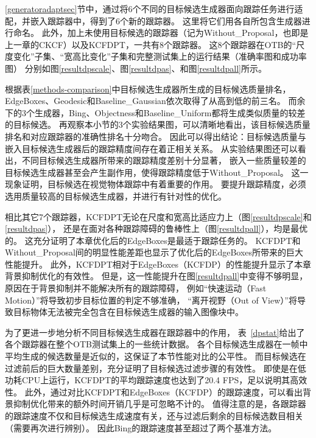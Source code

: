 \ref{generatoradaptsec}节中，通过将6个不同的目标候选生成器面向跟踪任务进行适配，并嵌入跟踪器中，得到了6个新的跟踪器。
这里将它们用各自所包含生成器进行命名。
此外，加上未使用目标候选的跟踪器（记为Without\_Proposal，也即是上一章的CKCF）以及KCFDPT，一共有8个跟踪器。
这8个跟踪器在OTB的``尺度变化''子集、``宽高比变化''子集和完整测试集上的运行结果（准确率图和成功率图）
分别如图\ref{resultdpscale}、图\ref{resultdpas}、和图\ref{resultdpall}所示。

根据表\ref{methods-comparison}中目标候选生成器所生成的目标候选质量排名，
EdgeBoxes、Geodesic和Baseline\_Gaussian依次取得了从高到低的前三名。
而余下的3个生成器，Bing、Objectness和Baseline\_Uniform都将生成类似质量的较差的目标候选。
再观察本小节的3个实验结果图，可以清晰地看出，该目标候选质量排名和对应跟踪器的准确性排名十分吻合。
因此可以得出结论：目标候选质量与嵌入目标候选生成器后的跟踪精度间存在着正相关关系。
从实验结果图还可以看出，不同目标候选生成器所带来的跟踪精度差别十分显著，
嵌入一些质量较差的目标候选生成器甚至会产生副作用，使得跟踪精度低于Without\_Proposal。
这一现象证明，目标候选在视觉物体跟踪中有着重要的作用。
要提升跟踪精度，必须选用质量较高的目标候选生成器，并进行有针对性的优化。

相比其它7个跟踪器，KCFDPT无论在尺度和宽高比适应力上（图\ref{resultdpscale}和\ref{resultdpas}），
还是在面对各种跟踪障碍的鲁棒性上（图\ref{resultdpall}），均是最优的。
这充分证明了本章优化后的EdgeBoxes是最适于跟踪任务的。
KCFDPT和Without\_Proposal间的明显性能差距也显示了优化后的EdgeBoxes所带来的巨大性能提升。
此外，KCFDPT相对于EdgeBoxes（KCFDP）的性能提升显示了本章背景抑制优化的有效性。
但是，这一性能提升在图\ref{resultdpall}中变得不够明显，原因在于背景抑制并不能解决所有的跟踪障碍，
例如``快速运动（Fast Motion）''将导致初步目标位置的判定不够准确，
``离开视野（Out of View）''将导致目标物体无法被完全包含在目标候选生成器的输入图像块中。

为了更进一步地分析不同目标候选生成器在跟踪器中的作用，
表~\ref{dpstat}给出了各个跟踪器在整个OTB测试集上的一些统计数据。
各个目标候选生成器在一帧中平均生成的候选数量是近似的，这保证了本节性能对比的公平性。
而目标候选在过滤前后的巨大数量差别，充分证明了目标候选过滤步骤的有效性。
即使是在低功耗CPU上运行，KCFDPT的平均跟踪速度也达到了20.4 FPS，足以说明其高效性。
此外，通过对比KCFDPT和EdgeBoxes（KCFDP）的跟踪速度，可以看出背景抑制优化带来的额外时间开销几乎是可忽略不计的。
值得注意的是，各跟踪器的跟踪速度不仅和目标候选生成速度有关，还与过滤后剩余的目标候选数目相关（需要再次进行辨别）。
因此Bing的跟踪速度甚至超过了两个基准方法。

